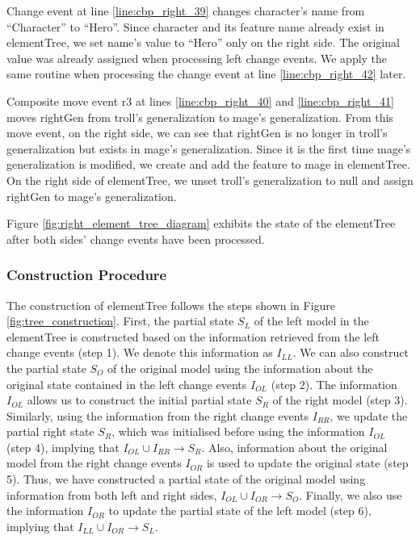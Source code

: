 Change event at line \ref{line:cbp_right_39} changes \textsf{character}’s \textsf{name} from “Character” to “Hero”. Since \textsf{character} and its feature \textsf{name} already exist in \textsf{elementTree}, we set \textsf{name}’s value to “Hero” only on the right side. The original value was already assigned when processing left change events. We apply the same routine when processing the change event at line \ref{line:cbp_right_42} later.



Composite move event \textsf{r3} at lines \ref{line:cbp_right_40} and \ref{line:cbp_right_41} moves \textsf{rightGen} from \textsf{troll}’s \textsf{generalization} to \textsf{mage}’s \textsf{generalization}. From this move event, on the right side, we can see that \textsf{rightGen} is no longer in \textsf{troll}’s \textsf{generalization} but exists in \textsf{mage}’s \textsf{generalization}. Since it is the first time \textsf{mage}’s \textsf{generalization} is modified, we create and add the feature to \textsf{mage} in \textsf{elementTree}. On the right side of \textsf{elementTree}, we unset \textsf{troll}’s \textsf{generalization} to null and assign \textsf{rightGen} to \textsf{mage}’s \textsf{generalization}.

Figure \ref{fig:right_element_tree_diagram} exhibits the state of the \textsf{elementTree} after both sides’ change events have been processed.

\subsubsection{Construction Procedure}\label{sec:construction_procedure}

The construction of \textsf{elementTree} follows the steps shown in Figure \ref{fig:tree_construction}. First, the partial state $S_{L}$ of the left model in the \textsf{elementTree} is constructed based on the information retrieved from the left change events (step 1). We denote this information as $I_{LL}$. We can also construct the partial state $S_{O}$ of the original model using the information about the original state contained in the left change events $I_{OL}$ (step 2). The information $I_{OL}$ allows us to construct the initial partial state $S_{R}$ of the right model (step 3). Similarly, using the information from the right change events $I_{RR}$, we update the partial right state $S_{R}$, which was initialised before using the information $I_{OL}$ (step 4), implying that $I_{OL} \cup I_{RR} \rightarrow S_{R}$. Also, information about the original model from the right change events $I_{OR}$ is used to update the original state (step 5). Thus, we have constructed a partial state of the original model using information from both left and right sides, $I_{OL} \cup I_{OR} \rightarrow S_{O}$. Finally, we also use the information $I_{OR}$ to update the partial state of the left model (step 6), implying that $I_{LL} \cup I_{OR} \rightarrow S_{L}$.

